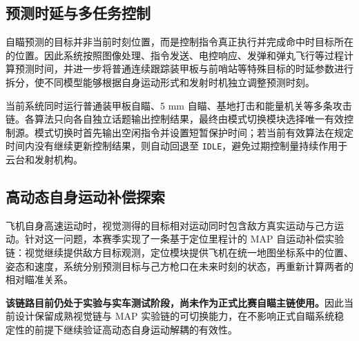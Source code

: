 \subsection{预测时延与多任务控制}
自瞄预测的目标并非当前时刻位置，而是控制指令真正执行并完成命中时目标所在的位置。因此系统按照图像处理、指令发送、电控响应、发弹和弹丸飞行等过程计算预测时间，并进一步将普通连续跟踪装甲板与前哨站等特殊目标的时延参数进行拆分，使不同模型能够根据自身运动形式和发射时机独立调整预测时刻。

当前系统同时运行普通装甲板自瞄、5 mm 自瞄、基地打击和能量机关等多条攻击链。各算法只向各自独立话题输出控制结果，最终由模式切换模块选择唯一有效控制源。模式切换时首先输出空闲指令并设置短暂保护时间；若当前有效算法在规定时间内没有继续更新控制结果，则自动回退至 \lstinline{IDLE}，避免过期控制量持续作用于云台和发射机构。

\subsection{高动态自身运动补偿探索}
飞机自身高速运动时，视觉测得的目标相对运动同时包含敌方真实运动与己方运动。针对这一问题，本赛季实现了一条基于定位里程计的 MAP 自运动补偿实验链：视觉继续提供敌方目标观测，定位模块提供飞机在统一地图坐标系中的位置、姿态和速度，系统分别预测目标与己方枪口在未来时刻的状态，再重新计算两者的相对瞄准关系。

\textbf{该链路目前仍处于实验与实车测试阶段，尚未作为正式比赛自瞄主链使用。}因此当前设计保留成熟视觉链与 MAP 实验链的可切换能力，在不影响正式自瞄系统稳定性的前提下继续验证高动态自身运动解耦的有效性。
